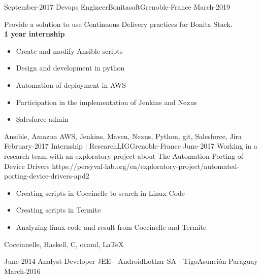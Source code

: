 %
%
%
\begin{experiences}
  \experience
    {September-2017}   {Devops Engineer}{Bonitasoft}{Grenoble-France}
    {March-2019}
                    {Provide a solution to use Continuous Delivery practices for Bonita Stack. \\
                    \textbf{\small 1 year internship}
                    \begin{itemize}
                        \item Create and modify Ansible scripts
                        \item Design and development in python
                        \item Automation of deployment in AWS
                        \item Participation in the implementation of Jenkins and Nexus
                        \item Salesforce admin
                      \end{itemize}}
                    {Ansible, Amazon AWS, Jenkins, Maven, Nexus, Python, git, Salesforce, Jira}
  \emptySeparator
    \projectexperiences
    {February-2017}   {Internship | Research}{LIG}{Grenoble-France}
    {June-2017}
                    {Working in a research team with an exploratory project about The Automation Porting of Device Drivers \tiny{https://persyval-lab.org/en/exploratory-project/automated-porting-device-drivers-apd2}}
                    {
                    \begin{itemize}
                        \item Creating scripts in Coccinelle to search in Linux Code
                        \item Creating scripts in Termite
                        \item Analyzing linux code and result from Coccinelle and Termite
                      \end{itemize}
                     }
                    {Coccinnelle, Haskell, C, ocaml, \LaTeX}
  \emptySeparator

  \projectexperiences
    {June-2014}   {Analyst-Developer JEE - Android}{Lothar SA - Tigo}{Asunción-Paraguay}
    {March-2016} {

}
\end{experiences}
